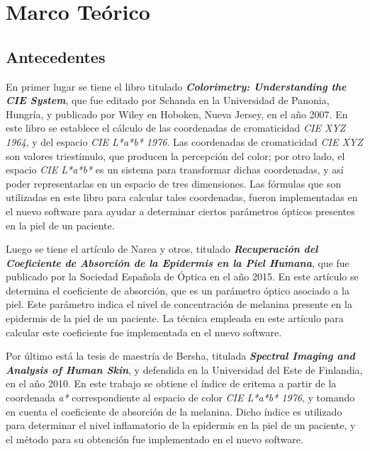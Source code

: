 \chapter{\label{cap:2}Marco Te\'{o}rico}

	\section{Antecedentes}	
			
			En primer lugar se tiene el libro titulado  \textbf{\textit{Colorimetry: Understanding the CIE System}}, que fue editado por Schanda en la Universidad de Panonia, Hungr\'{i}a, y publicado por Wiley en Hoboken, Nueva Jersey, en el a\~{n}o 2007. En este libro se establece el c\'{a}lculo de las coordenadas de cromaticidad \textit{CIE XYZ 1964}, y del espacio \textit{CIE L*a*b* 1976}. Las coordenadas de cromaticidad \textit{CIE XYZ} son valores triest\'{i}mulo, que producen la percepci\'{o}n del color; por otro lado, el espacio \textit{CIE L*a*b*} es un sistema para transformar dichas coordenadas, y as\'{i} poder representarlas en un espacio de tres dimensiones. Las f\'{o}rmulas que son utilizadas en este libro para calcular tales coordenadas, fueron implementadas en el nuevo software para ayudar a determinar ciertos par\'{a}metros \'{o}pticos presentes en la piel de un paciente.
			
			Luego se tiene el art\'{i}culo de Narea y otros, titulado \textbf{\textit{Recuperaci\'{o}n del Coeficiente de Absorci\'{o}n de la Epidermis en la Piel Humana}}, que fue publicado por la Sociedad Espa\~{n}ola de \'{O}ptica en el a\~{n}o 2015. En este art\'{i}culo se determina el coeficiente de absorci\'{o}n, que es un par\'{a}metro \'{o}ptico asociado a la piel. Este par\'{a}metro indica el nivel de concentraci\'{o}n de melanina presente en la epidermis de la piel de un paciente. La t\'{e}cnica empleada en este art\'{i}culo para calcular este coeficiente fue implementada en el nuevo software.
			
			Por \'{u}ltimo est\'{a} la tesis de maestr\'{i}a de Bersha, titulada \textbf{\textit{Spectral Imaging and Analysis of Human Skin}}, y defendida en la Universidad del Este de Finlandia, en el a\~{n}o 2010. En este trabajo se obtiene el \'{i}ndice de eritema a partir de la coordenada \textit{a*} correspondiente al espacio de color \textit{CIE L*a*b* 1976}, y tomando en cuenta el coeficiente de absorci\'{o}n de la melanina. Dicho \'{i}ndice es utilizado para determinar el nivel inflamatorio de la epidermis en la piel de un paciente, y el m\'{e}todo para su obtenci\'{o}n fue implementado en el nuevo software.


